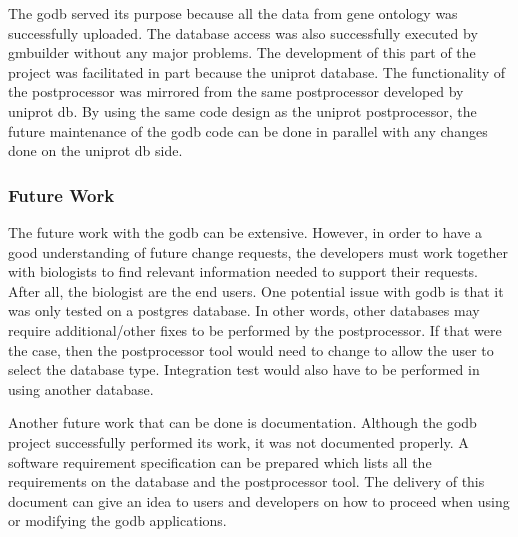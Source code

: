 The godb served its purpose because all the data from gene ontology was successfully uploaded.  The database access was also
successfully executed by gmbuilder without any major problems.  The development of this part of the project was facilitated
in part because the uniprot database.  The functionality of the postprocessor was mirrored from the same postprocessor
developed by uniprot db.  By using the same code design as the uniprot postprocessor, the future maintenance of the godb
code can be done in parallel with any changes done on the uniprot db side.

\subsubsection{Future Work}
The future work with the godb can be extensive.  However, in order to have a good understanding of
future change requests, the developers must work together with biologists to find relevant information needed to support their requests.
After all, the biologist are the end users. One potential issue with  godb is that it was only tested on a postgres database. In other
words, other databases may require additional/other fixes to be performed by the postprocessor. If that were the case, then
the postprocessor tool would need to change to allow the user to select the database type. Integration test would also have to be performed
in using another database.

Another future work that can be done is
documentation.  Although the godb project successfully performed its work, it was not documented properly.  A software
requirement specification can be prepared which lists all the requirements on the database and the postprocessor tool.  The
delivery of this document can give an idea to users and developers on how to proceed when using or modifying the godb
applications.
 
%

